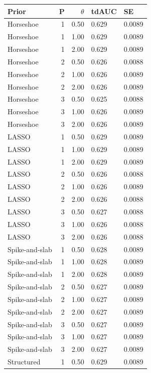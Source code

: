 \begin{tabular}{lrrll}
  \hline
Prior & P & $\theta$ & tdAUC & SE \\ 
  \hline
Horseshoe &   1 & 0.50 & 0.629 & 0.0089 \\ 
  Horseshoe &   1 & 1.00 & 0.629 & 0.0089 \\ 
  Horseshoe &   1 & 2.00 & 0.629 & 0.0089 \\ 
  Horseshoe &   2 & 0.50 & 0.626 & 0.0088 \\ 
  Horseshoe &   2 & 1.00 & 0.626 & 0.0089 \\ 
  Horseshoe &   2 & 2.00 & 0.626 & 0.0089 \\ 
  Horseshoe &   3 & 0.50 & 0.625 & 0.0088 \\ 
  Horseshoe &   3 & 1.00 & 0.626 & 0.0089 \\ 
  Horseshoe &   3 & 2.00 & 0.626 & 0.0089 \\ 
  LASSO &   1 & 0.50 & 0.629 & 0.0089 \\ 
  LASSO &   1 & 1.00 & 0.629 & 0.0089 \\ 
  LASSO &   1 & 2.00 & 0.629 & 0.0089 \\ 
  LASSO &   2 & 0.50 & 0.626 & 0.0088 \\ 
  LASSO &   2 & 1.00 & 0.626 & 0.0089 \\ 
  LASSO &   2 & 2.00 & 0.626 & 0.0088 \\ 
  LASSO &   3 & 0.50 & 0.627 & 0.0088 \\ 
  LASSO &   3 & 1.00 & 0.626 & 0.0088 \\ 
  LASSO &   3 & 2.00 & 0.626 & 0.0088 \\ 
  Spike-and-slab &   1 & 0.50 & 0.628 & 0.0089 \\ 
  Spike-and-slab &   1 & 1.00 & 0.628 & 0.0089 \\ 
  Spike-and-slab &   1 & 2.00 & 0.628 & 0.0089 \\ 
  Spike-and-slab &   2 & 0.50 & 0.627 & 0.0089 \\ 
  Spike-and-slab &   2 & 1.00 & 0.627 & 0.0089 \\ 
  Spike-and-slab &   2 & 2.00 & 0.627 & 0.0089 \\ 
  Spike-and-slab &   3 & 0.50 & 0.627 & 0.0089 \\ 
  Spike-and-slab &   3 & 1.00 & 0.627 & 0.0089 \\ 
  Spike-and-slab &   3 & 2.00 & 0.627 & 0.0089 \\ 
  Structured &   1 & 0.50 & 0.629 & 0.0089 \\ 

\end{tabular}
